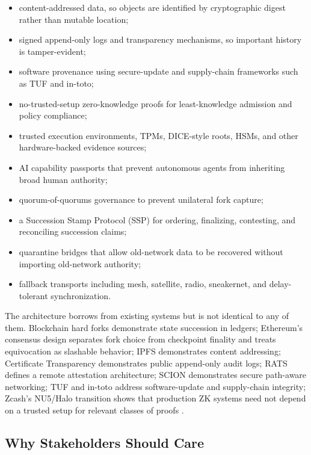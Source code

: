 \documentclass[11pt,letterpaper]{article}
\begin{document}
\begin{itemize}[leftmargin=1.4em]
\item content-addressed data, so objects are identified by cryptographic digest rather than mutable location;
\item signed append-only logs and transparency mechanisms, so important history is tamper-evident;
\item software provenance using secure-update and supply-chain frameworks such as TUF and in-toto;
\item no-trusted-setup zero-knowledge proofs for least-knowledge admission and policy compliance;
\item trusted execution environments, TPMs, DICE-style roots, HSMs, and other hardware-backed evidence sources;
\item AI capability passports that prevent autonomous agents from inheriting broad human authority;
\item quorum-of-quorums governance to prevent unilateral fork capture;
\item a Succession Stamp Protocol (SSP) for ordering, finalizing, contesting, and reconciling succession claims;
\item quarantine bridges that allow old-network data to be recovered without importing old-network authority;
\item fallback transports including mesh, satellite, radio, sneakernet, and delay-tolerant synchronization.
\end{itemize}

The architecture borrows from existing systems but is not identical to any of them. Blockchain hard forks demonstrate state succession in ledgers; Ethereum's consensus design separates fork choice from checkpoint finality and treats equivocation as slashable behavior; IPFS demonstrates content addressing; Certificate Transparency demonstrates public append-only audit logs; RATS defines a remote attestation architecture; SCION demonstrates secure path-aware networking; TUF and in-toto address software-update and supply-chain integrity; Zcash's NU5/Halo transition shows that production ZK systems need not depend on a trusted setup for relevant classes of proofs \cite{ethereum_forks,ethereum_gasper,ethereum_slashing,ethereum_weak_subjectivity,ipfs_cid,ct,rfc9334,scion,tuf,intoto,zcash_nu5,zcash_zip224}.

\subsection{Why Stakeholders Should Care}
\end{document}
